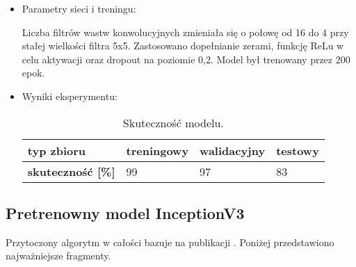 {\begin{itemize}
\item Parametry sieci i treningu:

Liczba filtrów wastw konwolucyjnych zmieniała się o połowę od 16 do 4 przy stałej wielkości filtra 5x5. Zastosowano dopełnianie zerami, funkcję ReLu w celu aktywacji oraz dropout na poziomie 0,2. Model był trenowany przez 200 epok.
\item Wyniki eksperymentu:

\begin{table}[h]
\centering
\caption[Short Heading]{Skuteczność modelu.}
\begin{tabular}{|l|l|l|l|}
\hline
\textbf{typ zbioru}           & \textbf{treningowy} & \textbf{walidacyjny} & \textbf{testowy} \\ \hline
\textbf{skuteczność {[}\%{]}} & 99                  & 97                   & 83               \\ \hline
\end{tabular}
\end{table}

\end{itemize}
}

\subsection{Pretrenowny model InceptionV3}
Przytoczony algorytm w całości bazuje na publikacji \cite{kaggle_3}. Poniżej przedstawiono najważniejsze fragmenty.

